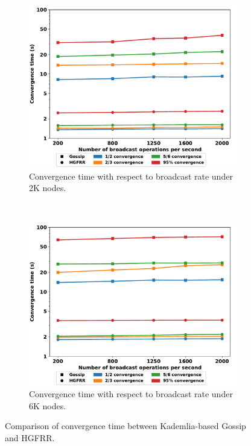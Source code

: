 \begin{figure}[ht]
    \begin{subfigure}[b]{0.23\textwidth}
    \includegraphics[width=\textwidth]{figures/hgfr_ourgossip_cvgtime_on_tps_2k.pdf}
    \caption{Convergence time with respect to broadcast rate under 2K nodes.}
    \label{hgfr_ourgossip_cvgtime_on_tps_2k}
    \end{subfigure}
    ~
    \begin{subfigure}[b]{0.23\textwidth}
	  \includegraphics[width=\textwidth]{figures/hgfr_ourgossip_cvgtime_on_tps_6k.pdf}
	  \caption{Convergence time with respect to broadcast rate under 6K nodes.}
    \label{hgfr_ourgossip_cvgtime_on_tps_6k}
    \end{subfigure}

	\caption{Comparison of convergence time between Kademlia-based Gossip and HGFRR.}
	\label{fig_eth_ourgossip_cvgtime}
	\vspace{-0.5cm}
\end{figure}


